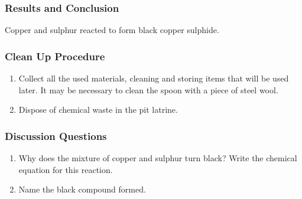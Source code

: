 \subsubsection*{Results and Conclusion}
Copper and sulphur reacted to form black copper sulphide.

\subsubsection*{Clean Up Procedure}
\begin{enumerate}
\item{Collect all the used materials, cleaning and storing items that will be used later. It may be necessary to clean the spoon with a piece of steel wool.}
\item{Dispose of chemical waste in the pit latrine.}
\end{enumerate}

\subsubsection*{Discussion Questions}
\begin{enumerate}
\item{Why does the mixture of copper and sulphur turn black? Write the chemical equation for this reaction.}
\item{Name the black compound formed.}
\end{enumerate}
